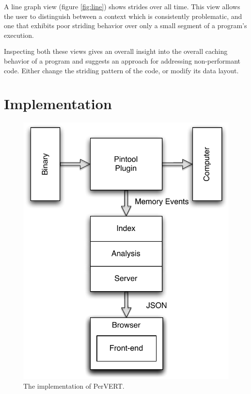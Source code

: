\documentclass[annual]{acmsiggraph}
\begin{document}
    
    A line graph view (figure \ref{fig:line}) shows strides over all time.
    This view allows the user to distinguish between a context which is consistently problematic, 
      and one that exhibits poor striding behavior over only a small segment of a program's execution.

    Inspecting both these views gives an overall insight into the overall caching behavior of a program 
      and suggests an approach for addressing non-performant code.
    Either change the striding pattern of the code, or modify its data layout.

\section{Implementation}\label{ch_i}

	\begin{figure}[t]
		\centering
    \includegraphics[scale=0.55]{images/SystemDiag.pdf}
		\caption{The implementation of PerVERT.}
    \label{fig:system}
	\end{figure}
\end{document}
